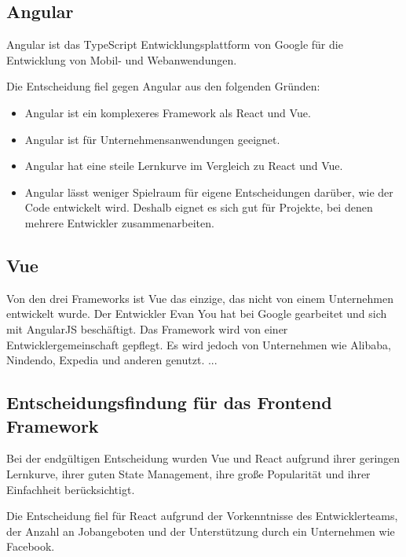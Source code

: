 \subsection{Angular}
Angular ist das TypeScript Entwicklungsplattform von Google für die Entwicklung von
 Mobil- und Webanwendungen.

Die Entscheidung fiel gegen Angular aus den folgenden Gründen:
\begin{itemize}
  \item
        Angular ist ein komplexeres Framework als React und Vue.
  \item
        Angular ist für Unternehmensanwendungen geeignet.
  \item
        Angular hat eine steile Lernkurve im Vergleich zu React und Vue.{\cite{E01}}
  \item
        Angular lässt weniger Spielraum für eigene Entscheidungen darüber, wie der Code entwickelt wird. Deshalb eignet es sich gut für Projekte, bei denen mehrere Entwickler zusammenarbeiten.
\end{itemize}

\subsection{Vue}
Von den drei Frameworks ist Vue das einzige, das nicht von einem Unternehmen entwickelt wurde. Der Entwickler Evan You hat bei Google gearbeitet und sich mit AngularJS beschäftigt. Das Framework wird von einer Entwicklergemeinschaft gepflegt. Es wird jedoch von Unternehmen wie Alibaba, Nindendo, Expedia und anderen genutzt.
...



{\cite{V02}}


\subsection{Entscheidungsfindung für das Frontend Framework}
Bei der endgültigen Entscheidung wurden Vue und React aufgrund ihrer geringen Lernkurve, ihrer guten State Management, ihre große Popularität und ihrer Einfachheit berücksichtigt.

Die Entscheidung fiel für React aufgrund der Vorkenntnisse des Entwicklerteams, der Anzahl an Jobangeboten und der Unterstützung durch ein Unternehmen wie Facebook.

